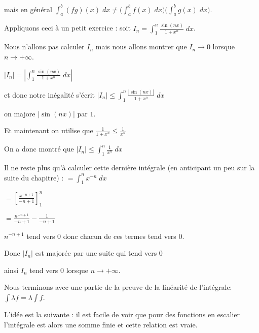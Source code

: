 \change

mais en général $\int_a^b (f g)(x)\;dx \neq
\big(\int_a^b f(x)\;dx\big)\big(\int_a^b g(x)\;dx\big)$.

\change

Appliquons ceci à un petit exercice :
soit $I_n = \int_1^n \frac{\sin(n x)}{1+x^n} \; dx$. 

\change

Nous n'allons pas calculer $I_n$ mais nous allons montrer que $I_n \to 0$ lorsque $n\to +\infty$.

\change

$|I_n| = \left| \int_1^n \frac{\sin(n x)}{1+x^n} \; dx \right|$

\change

et donc notre inégalité s'écrit $|I_n| \le  \int_1^n  \frac{|\sin(n x)|}{1+x^n} \; dx$

\change

on majore $|\sin(n x)|$ par $1$.

\change

Et maintenant on utilise que $\frac{1}{1+x^n} \le  \frac{1}{x^n}$

\change

On a donc montré que 
$|I_n| \le \int_1^n  \frac{1}{x^n} \; dx$

\change

Il ne reste plus qu'à calculer cette dernière intégrale 
(en anticipant un peu sur la suite du chapitre) :
$ = \int_1^n x^{-n} \; dx$

\change

$ = \left[\frac{x^{-n+1}}{-n+1}\right]_1^n $

\change

$= \frac{n^{-n+1}}{-n+1} - \frac{1}{-n+1} $

\change

$n^{-n+1}$ tend vers $0$ donc chacun de ces termes tend vers $0$.

\change

Donc $|I_n|$ est majorée par une suite qui tend vers $0$ 

ainsi $I_n$ tend vers $0$ lorsque $n \to +\infty$.



\diapo


Nous terminons avec une partie de la preuve de la linéarité de l'intégrale:
$\int \lambda f= \lambda \int f$.

L'idée est la suivante : il est facile de voir que pour des fonctions en escalier
l'intégrale est alors une somme finie et cette relation est vraie. 

